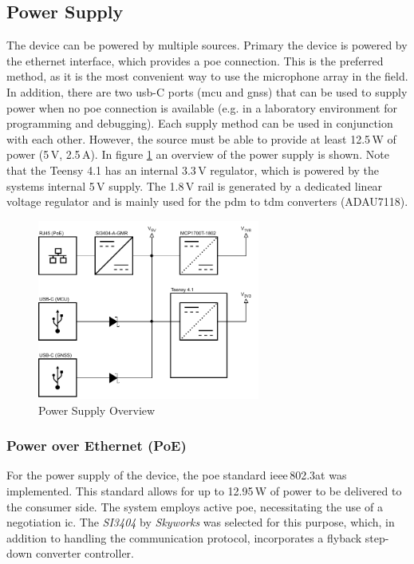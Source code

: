 \subsection{Power Supply}
The device can be powered by multiple sources.
Primary the device is powered by the ethernet interface, which provides a \acrfull{poe} connection.
This is the preferred method, as it is the most convenient way to use the microphone array in the field.
In addition, there are two \acrshort{usb}-C ports (\acrshort{mcu} and \acrshort{gnss}) that can be used to supply power when no \acrshort{poe} connection is available (e.g. in a laboratory environment for programming and debugging).
Each supply method can be used in conjunction with each other. However, the source must be able to provide at least 12.5\,W of power (5\,V, 2.5\,A).
In figure \ref{fig:power_supply_overview} an overview of the power supply is shown.
Note that the Teensy 4.1 has an internal 3.3\,V regulator, which is powered by the systems internal 5\,V supply.
The 1.8\,V rail is generated by a dedicated linear voltage regulator and is mainly used for the \acrshort{pdm} to \acrshort{tdm} converters (ADAU7118).
\begin{figure}[h!]
	\centering
	\vspace{-0.2cm}
	\includegraphics[width=0.65\textwidth]{images/6_design_final/final_design_power_supply.pdf}
	\vspace{-0.2cm}
	\caption{Power Supply Overview}
	\label{fig:power_supply_overview}
\end{figure}

\subsubsection{Power over Ethernet (PoE)}
For the power supply of the device, the \acrfull{poe} standard \acrshort{ieee}\,802.3at was implemented.
This standard allows for up to 12.95\,W of power to be delivered to the consumer side.
The system employs active \acrshort{poe}, necessitating the use of a negotiation \acrfull{ic}.
The \textit{SI3404} by \textit{Skyworks} was selected for this purpose, which, in addition to handling the communication protocol, incorporates a flyback step-down converter controller.


